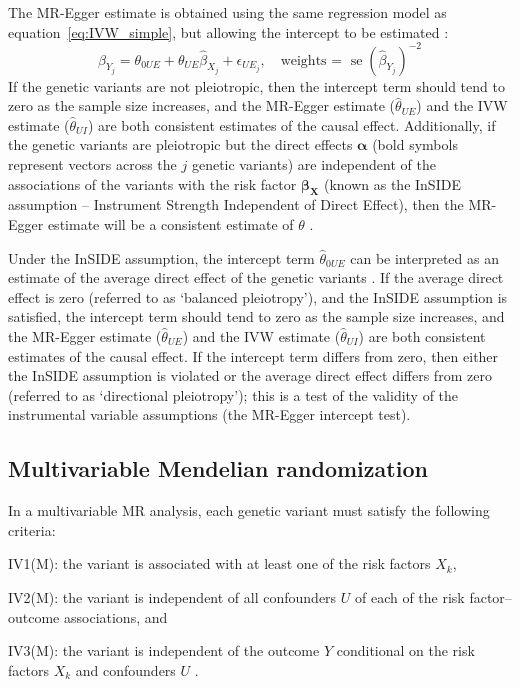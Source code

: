 \documentclass[a4paper,12pt]{article}
\DeclareMathOperator{\se}{se} %
\begin{document}
\begin{bibunit}[wileyj]
The MR-Egger estimate is obtained using the same regression model as equation~\ref{eq:IVW_simple}, but allowing the intercept to be estimated \cite{bowden2015egger}:
\begin{equation}
\hat{\beta}_{Y_{j}} = \theta_{0UE} + \theta_{UE} \hat{\beta}_{X_{j}} + \epsilon_{UE_{j}}, \quad \mbox{weights = } \se(\hat{\beta}_{Y_{j}})^{-2} \label{eq:uv_egger}
\end{equation}
If the genetic variants are not pleiotropic, then the intercept term should tend to zero as the sample size increases, and the MR-Egger estimate ($\hat{\theta}_{UE}$) and the IVW estimate ($\hat{\theta}_{UI}$) are both consistent estimates of the causal effect. Additionally, if the genetic variants are pleiotropic but the direct effects $\boldsymbol{\alpha}$ (bold symbols represent vectors across the $j$ genetic variants) are independent of the associations of the variants with the risk factor $\boldsymbol{\beta_{X}}$ (known as the InSIDE assumption -- Instrument Strength Independent of Direct Effect), then the MR-Egger estimate will be a consistent estimate of $\theta$ \cite{bowden2015egger,kolesar2014}. %

Under the InSIDE assumption, the intercept term $\hat{\theta}_{0UE}$ can be interpreted as an estimate of the average direct effect of the genetic variants \cite{bowden2016consistent}. If the average direct effect is zero (referred to as `balanced pleiotropy'), and the InSIDE assumption is satisfied, the intercept term should tend to zero as the sample size increases, and the MR-Egger estimate ($\hat{\theta}_{UE}$) and the IVW estimate ($\hat{\theta}_{UI}$) are both consistent estimates of the causal effect. If the intercept term differs from zero, then either the InSIDE assumption is violated or the average direct effect differs from zero (referred to as `directional pleiotropy'); this is a test of the validity of the instrumental variable assumptions (the MR-Egger intercept test). 

\subsection{Multivariable Mendelian randomization}
In a multivariable MR analysis, each genetic variant must satisfy the following criteria: \\
\begin{compactitem}
\item IV1(M): the variant is associated with at least one of the risk factors $X_{k}$,
\item IV2(M): the variant is independent of all confounders $U$ of each of the risk factor--outcome associations, and
\item IV3(M): the variant is independent of the outcome $Y$ conditional on the risk factors $X_{k}$ and confounders $U$ \cite{burgess2015multivariable}.  \\
\end{compactitem}


\end{bibunit}
\end{document}
